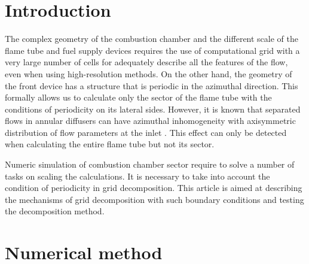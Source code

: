 \documentclass[
11pt,%
tightenlines,%
twoside,%
onecolumn,%
nofloats,%
nobibnotes,%
nofootinbib,%
superscriptaddress,%
noshowpacs,%
centertags]%
{revtex4}
\begin{document}


\maketitle


\section{Introduction}

The complex geometry of the combustion chamber and the different scale of the
flame tube and fuel supply devices requires the use of computational grid with
 a very large number of cells for adequately describe all the features of the flow,
  even when using high-resolution methods.
On the other hand, the geometry of the front device has a structure that is periodic in the azimuthal direction.
This formally allows us to calculate only the sector of the flame
tube with the conditions of periodicity on its lateral sides.
However, it is known that separated flows in annular diffusers can have azimuthal inhomogeneity with axisymmetric distribution of flow parameters at the inlet \cite{Lyub_Diffusers}.
This effect can only be detected when calculating the entire flame tube but not its sector.

Numeric simulation of combustion chamber sector require to solve a number
 of tasks on scaling the calculations. It is necessary to take into account the
 condition of periodicity in grid decomposition. This article is aimed at describing
 the mechanisms of grid decomposition with such boundary conditions and testing the decomposition method.

\section{Numerical method}
\end{document}
